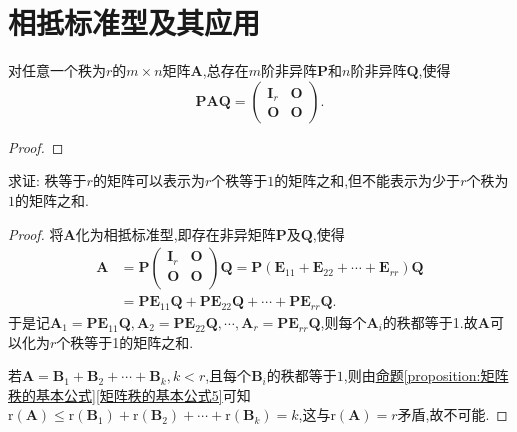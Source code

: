 \documentclass[../../main.tex]{subfiles}%
\begin{document}
\section{相抵标准型及其应用}

\begin{theorem}[矩阵的相抵标准型]\label{theorem:矩阵的相抵标准型}
对任意一个秩为\(r\)的\(m\times n\)矩阵\(\boldsymbol{A}\),总存在\(m\)阶非异阵\(\boldsymbol{P}\)和\(n\)阶非异阵\(\boldsymbol{Q}\),使得
\[
\boldsymbol{P}\boldsymbol{A}\boldsymbol{Q}=\begin{pmatrix}
\boldsymbol{I}_r&\boldsymbol{O}\\
\boldsymbol{O}&\boldsymbol{O}
\end{pmatrix}.
\]
\end{theorem}
\begin{proof}



\end{proof}

\begin{proposition}[矩阵的秩1分解]\label{proposition:矩阵的秩1分解}
求证: 秩等于\(r\)的矩阵可以表示为\(r\)个秩等于\(1\)的矩阵之和,但不能表示为少于\(r\)个秩为\(1\)的矩阵之和.
\end{proposition}
\begin{proof}

将\(\boldsymbol{A}\)化为相抵标准型,即存在非异矩阵\(\boldsymbol{P}\)及\(\boldsymbol{Q}\),使得
\begin{align*}
\boldsymbol{A}&=\boldsymbol{P}\left( \begin{matrix}
\boldsymbol{I}_r&		\boldsymbol{O}\\
\boldsymbol{O}&		\boldsymbol{O}\\
\end{matrix} \right) \boldsymbol{Q}=\boldsymbol{P}\left( \boldsymbol{E}_{11}+\boldsymbol{E}_{22}+\cdots +\boldsymbol{E}_{rr} \right) \boldsymbol{Q}
\\
&=\boldsymbol{PE}_{11}\boldsymbol{Q}+\boldsymbol{PE}_{22}\boldsymbol{Q}+\cdots +\boldsymbol{PE}_{rr}\boldsymbol{Q}.
\end{align*}
于是记$\boldsymbol{A}_1=\boldsymbol{PE}_{11}\boldsymbol{Q},\boldsymbol{A}_2=\boldsymbol{PE}_{22}\boldsymbol{Q},\cdots ,\boldsymbol{A}_r=\boldsymbol{PE}_{rr}\boldsymbol{Q}$,则每个$\boldsymbol{A}_i$的秩都等于1.故$\boldsymbol{A}$可以化为$r$个秩等于1的矩阵之和.

若\(\boldsymbol{A}=\boldsymbol{B}_1+\boldsymbol{B}_2+\cdots+\boldsymbol{B}_k,k < r\),且每个\(\boldsymbol{B}_i\)的秩都等于\(1\),则由\hyperref[矩阵秩的基本公式5]{命题\ref{proposition:矩阵秩的基本公式}\ref{矩阵秩的基本公式5}}可知\(\mathrm{r}(\boldsymbol{A})\leqslant \mathrm{r}(\boldsymbol{B}_1)+\mathrm{r}(\boldsymbol{B}_2)+\cdots+\mathrm{r}(\boldsymbol{B}_k)=k\),这与\(\mathrm{r}(\boldsymbol{A}) = r\)矛盾,故不可能.

\end{proof}
\end{document}
